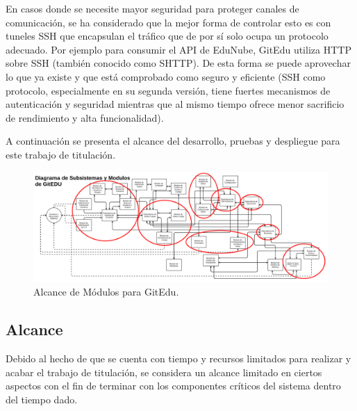 En casos donde se necesite mayor seguridad para proteger canales de comunicación, se ha considerado que la mejor forma de controlar esto es con tuneles SSH que encapsulan el tráfico que de por sí solo ocupa un protocolo adecuado. Por ejemplo para consumir el API de EduNube, GitEdu utiliza HTTP sobre SSH (también conocido como SHTTP). De esta forma se puede aprovechar lo que ya existe y que está comprobado como seguro y eficiente (SSH como protocolo, especialmente en su segunda versión, tiene fuertes mecanismos de autenticación y seguridad mientras que al mismo tiempo ofrece menor sacrificio de rendimiento y alta funcionalidad).

A continuación se presenta el alcance del desarrollo, pruebas y despliegue para este trabajo de titulación.

\pagebreak

\begin{landscape}

\begin{figure}
  \begin{center}
    \includegraphics[width=1.7\textwidth]{Figures/alc_mod_ge.png}
  \end{center}
  \caption{Alcance de Módulos para GitEdu.}
  \label{alc_mod_ge}
\end{figure}

\end{landscape}

\subsection{Alcance}

Debido al hecho de que se cuenta con tiempo y recursos limitados para realizar y acabar el trabajo de titulación, se considera un alcance limitado en ciertos aspectos con el fin de terminar con los componentes críticos del sistema dentro del tiempo dado.

